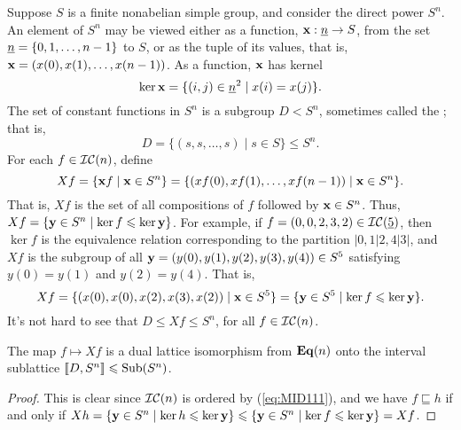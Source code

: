 Suppose $S$ is a finite nonabelian simple group, and consider the direct power $S^n$.
An element of $S^n$ may be viewed either as a function, $\mathbf{x} : \underline{n} \to S$,
from the set $\underline{n} = \{0, 1, \dots, n-1\}$ to $S$, or as the tuple 
of its values, that is,
%
%
    $\mathbf{x} = (x(0), x(1), \dots, x(n-1))$.
%
As a function, $\mathbf{x}$ has kernel
\[
\ker \mathbf{x} = \{(i,j) \in \underline{n}^2 \mid x(i) = x(j)\}.
\]
The set of constant functions in $S^n$ is a subgroup $D < S^n$, sometimes called the
; that is,
\[
D = \{(s, s, \dots, s) \mid s\in S\} \leq S^n.
\]
For each $f \in \mathcal{IC}(n)$, define
\[
Xf = \{\mathbf{x} f \mid \mathbf{x} \in S^n\} =
\{(xf(0), xf(1), \dots, xf(n-1)) \mid \mathbf{x} \in S^n\}.
\]
That is, $Xf$ is the set of all compositions of
$f$ followed by $\mathbf{x}\in S^n$.
Thus, $Xf = \{ \mathbf{y}\in S^n \mid \ker f \leqslant \ker \mathbf{y} \}$.
For example, 
if $f = (0, 0, 2, 3, 2)\in \mathcal{IC}(\underline{5})$, then 
$\ker f$ is the equivalence relation corresponding to
the partition $|0,1|2,4|3|$, and 
$Xf$ is the subgroup of all
$\mathbf{y} = (y(0), y(1), y(2), y(3), y(4))\in S^5$ satisfying $y(0) = y(1)$ and
$y(2) = y(4)$. That is,
\[Xf = \{(x(0), x(0), x(2), x(3), x(2)) \mid \mathbf{x}\in S^5\}
=\{\mathbf{y}\in S^5 \mid \ker f \leqslant \ker \mathbf{y}\}.\]
It's not hard to see that $D \leq Xf\leq S^n$, for all $f\in \mathcal{IC}(n)$.

\begin{lemma}
  \label{lem:latt-duals}
  The map $f \mapsto Xf$ is a dual lattice isomorphism from $\mathbf{Eq}(n)$ onto the
  interval sublattice $\llbracket D, S^n\rrbracket \leqslant \operatorname{Sub}(S^n)$.
\end{lemma}
\begin{proof}
  This is clear since $\mathcal{IC}(n)$ is ordered by (\ref{eq:MID111}), and 
  we have 
  $f\sqsubseteq h$ if and only if
  $Xh = \{\mathbf{y} \in S^n \mid \ker h \leqslant \ker \mathbf{y} \}
  \leqslant \{\mathbf{y} \in S^n \mid \ker f \leqslant \ker \mathbf{y} \} =  Xf$.
\end{proof}

